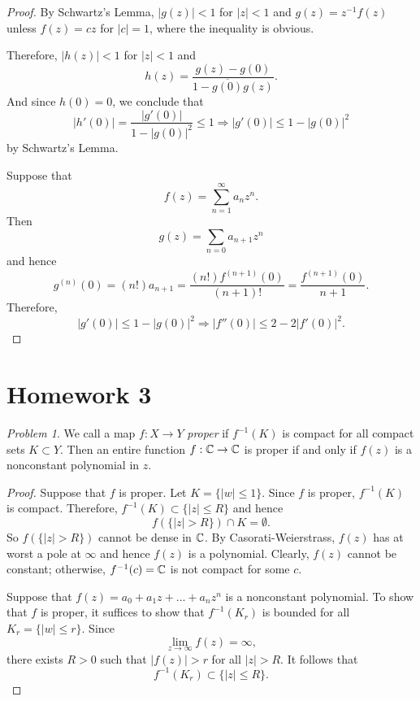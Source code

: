 \documentclass[11pt]{amsart}
\theoremstyle{remark}
\newtheorem{prob}{Problem}[section]
\theoremstyle{definition}
\numberwithin{equation}{section}
\begin{document}
\begin{proof}
    By Schwartz's Lemma, $|g(z)| < 1$ for $|z|<1$ and $g(z) = z^{-1}f(z)$ unless $f(z) = cz$ for $|c| = 1$, where the inequality is obvious.

    Therefore, $|h(z)| < 1$ for $|z|<1$ and
    \[
        h(z) = \frac{g(z) - g(0)}{1 - \overline{g(0)} g(z)}.
    \]
    And since $h(0) = 0$, we conclude that
    \[
        |h'(0)| = \frac{|g'(0)|}{1 - |g(0)|^2} \le 1\Rightarrow
        |g'(0)| \le 1 - |g(0)|^2
    \]
    by Schwartz's Lemma.

    Suppose that
    \[
        f(z) = \sum_{n=1}^\infty a_n z^n.
    \]
    Then
    \[
        g(z) = \sum_{n=0} a_{n+1} z^n
    \]
    and hence
    \[
        g^{(n)}(0) = (n!) a_{n+1} = \frac{(n!) f^{(n+1)}(0)}{(n+1)!} = \frac{f^{(n+1)}(0)}{n+1}.
    \]
    Therefore,
    \[
        |g'(0)| \le 1 - |g(0)|^2
        \Rightarrow |f''(0)| \le 2 - 2 |f'(0)|^2.
    \]
\end{proof}

\section{Homework 3}

\begin{prob}
    We call a map $f:X\to Y$ {\em proper} if $f^{-1}(K)$ is compact for all compact sets $K\subset Y$. Then an entire function $f: {\mathbb C} \to {\mathbb C}$ is proper if and only if $f(z)$ is a nonconstant polynomial in $z$.
\end{prob}

\begin{proof}
    Suppose that $f$ is proper. Let $K = \{|w|\le 1\}$. Since $f$ is proper, $f^{-1}(K)$ is compact. Therefore, $f^{-1}(K) \subset \{|z| \le R\}$ and hence
    \[
        f(\{|z|> R\})\cap K = \emptyset.
    \]
    So $f(\{|z|>R\})$ cannot be dense in ${\mathbb C}$. By Casorati-Weierstrass, $f(z)$ has at worst a pole at $\infty$ and hence $f(z)$ is a polynomial. Clearly, $f(z)$ cannot be constant; otherwise, $f^{-1}(c) = {\mathbb C}$ is not compact for some $c$.

    Suppose that $f(z) = a_0 + a_1 z + ... + a_n z^n$ is a nonconstant polynomial. To show that $f$ is proper, it suffices to show that $f^{-1}(K_r)$ is bounded for all $K_r = \{|w|\le r\}$. Since
    \[
        \lim_{z\to\infty} f(z) = \infty,
    \]
    there exists $R > 0$ such that $|f(z)| > r$ for all $|z| > R$. It follows that
    \[
        f^{-1}(K_r) \subset \{|z|\le R\}.
    \]
\end{proof}
\end{document}

